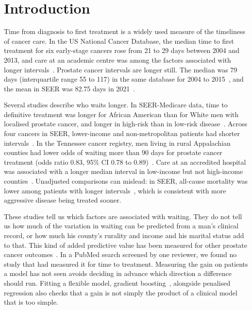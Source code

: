 \documentclass[10pt,a4paper,twocolumn]{article}
\begin{document}
\section{Introduction}

Time from diagnosis to first treatment is a widely used measure of the timeliness of cancer care. In the US National Cancer Database, the median time to first treatment for six early-stage cancers rose from 21 to 29 days between 2004 and 2013, and care at an academic centre was among the factors associated with longer intervals~\cite{khorana2019}. Prostate cancer intervals are longer still. The median was 79 days (interquartile range 55 to 117) in the same database for 2004 to 2015~\cite{cone2020}, and the mean in SEER was 82.75 days in 2021~\cite{abdelrahman2026}.

Several studies describe who waits longer. In SEER-Medicare data, time to definitive treatment was longer for African American than for White men with localised prostate cancer, and longer in high-risk than in low-risk disease~\cite{stokes2013}. Across four cancers in SEER, lower-income and non-metropolitan patients had shorter intervals~\cite{divanna2025}. In the Tennessee cancer registry, men living in rural Appalachian counties had lower odds of waiting more than 90 days for prostate cancer treatment (odds ratio 0.83, 95\% CI 0.78 to 0.89)~\cite{montielishino2021}. Care at an accredited hospital was associated with a longer median interval in low-income but not high-income counties~\cite{semprini2026}. Unadjusted comparisons can mislead: in SEER, all-cause mortality was lower among patients with longer intervals~\cite{ang2025}, which is consistent with more aggressive disease being treated sooner.

These studies tell us which factors are associated with waiting. They do not tell us how much of the variation in waiting can be predicted from a man's clinical record, or how much his county's rurality and income and his marital status add to that. This kind of added predictive value has been measured for other prostate cancer outcomes~\cite{tagai2025,ajjawi2026}. In a PubMed search screened by one reviewer, we found no study that had measured it for time to treatment. Measuring the gain on patients a model has not seen avoids deciding in advance which direction a difference should run. Fitting a flexible model, gradient boosting~\cite{ke2017}, alongside penalised regression also checks that a gain is not simply the product of a clinical model that is too simple.
\end{document}
